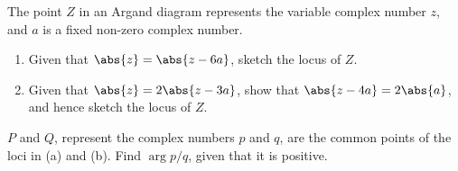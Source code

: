 \begin{solution}
\begin{center}
    \end{center}
\end{solution}

\begin{problem}
    The point $Z$ in an Argand diagram represents the variable complex number $z$, and $a$ is a fixed non-zero complex number.
    \begin{enumerate}
        \item Given that $\abs{z} = \abs{z - 6a}$, sketch the locus of $Z$.
        \item Given that $\abs{z} = 2\abs{z - 3a}$, show that $\abs{z - 4a} = 2\abs{a}$, and hence sketch the locus of $Z$.
    \end{enumerate}

    $P$ and $Q$, represent the complex numbers $p$ and $q$, are the common points of the loci in (a) and (b). Find $\arg{p/q}$, given that it is positive.
\end{problem}
